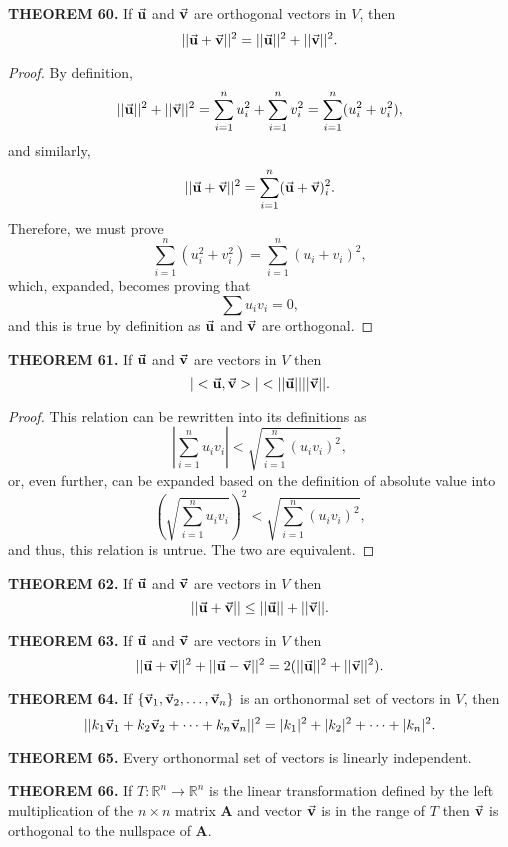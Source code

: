 \documentclass[12pt]{article}
\newcommand{\mat}[1]{\mathbf{#1}}
\newcommand{\theorem}[2]{\textbf{THEOREM #1.} #2}
\begin{document}
\theorem{60}{If $\va{u}$ and $\va{v}$ are orthogonal vectors in $V$, then $$||\va{u} + \va{v}||^2 = ||\va{u}||^2 + ||\va{v}||^2.$$}

\begin{proof}
By definition,
$$||\va{u}||^2 + ||\va{v}||^2 = \sum_{i=1}^{n} u_{i}^2 + \sum_{i=1}^{n} v_{i}^2 = \sum_{i=1}^{n} (u_i^2 + v_i^2),$$
and similarly,
$$||\va{u} + \va{v}||^2 = \sum_{i=1}^{n} (\va{u} + \va{v})_{i}^2.$$
Therefore, we must prove
$$\sum_{i=1}^{n} (u_{i}^2 + v_i^2) = \sum_{i=1}^{n} (u_i + v_i)^{2},$$
which, expanded, becomes proving that
$$\sum u_i v_i = 0,$$
and this is true by definition as $\va{u}$ and $\va{v}$ are orthogonal.
\end{proof}

\theorem{61}{If $\va{u}$ and $\va{v}$ are vectors in $V$ then $$|<\va{u}, \va{v}>| < ||\va{u}||||\va{v}||.$$}

\begin{proof}
This relation can be rewritten into its definitions as
$$\left|\sum_{i=1}^n u_i v_i\right| < \sqrt{\sum_{i=1}^n (u_i v_i)^2 },$$
or, even further, can be expanded based on the definition of absolute value into
$$\textstyle \left(\sqrt{\sum_{i=1}^n u_i v_i}\right)^2 < \sqrt{\sum_{i=1}^n (u_i v_i)^2 },$$
and thus, this relation is untrue. The two are equivalent.
\end{proof}

\theorem{62}{If $\va{u}$ and $\va{v}$ are vectors in $V$ then $$||\va{u} + \va{v}|| \le ||\va{u}|| + ||\va{v}||.$$}

\theorem{63}{If $\va{u}$ and $\va{v}$ are vectors in $V$ then $$||\va{u} + \va{v}||^2 + ||\va{u} - \va{v}||^2 = 2(||\va{u}||^2 + ||\va{v}||^2).$$}

\theorem{64}{If $\{ \va{v}_{1}, \va{v}_{2}, \dots, \va{v}_{n} \}$ is an orthonormal set of vectors in $V$, then $$||k_{1}\va{v}_{1} + k_{2}\va{v}_{2} + \dots + k_{n} \va{v}_{n} ||^2 = |k_{1}|^2 + |k_{2}|^2 + \dots + |k_{n}|^2.$$}

\theorem{65}{Every orthonormal set of vectors is linearly independent.}

\theorem{66}{If $T:\mathbb{R}^{n} \to \mathbb{R}^{n}$ is the linear transformation defined by the left multiplication of the $n \times n$ matrix $\mat{A}$ and vector $\va{v}$ is in the range of $T$ then $\va{v}$ is orthogonal to the nullspace of $\mat{A}$.}
\end{document}
